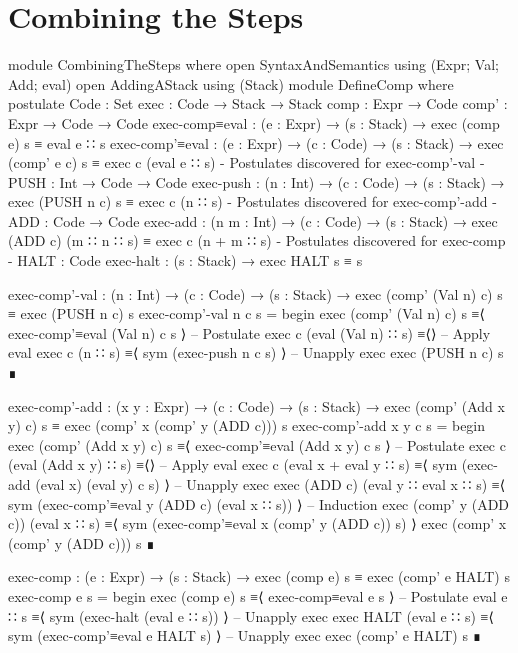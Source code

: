 \documentclass{article}
\begin{document}
\section{Combining the Steps}

\begin{code}
module CombiningTheSteps where
  open SyntaxAndSemantics using (Expr; Val; Add; eval)
  open AddingAStack using (Stack)
  module DefineComp where
    postulate
      Code : Set
      exec : Code → Stack → Stack
      comp : Expr → Code
      comp' : Expr → Code → Code
      exec-comp≡eval : (e : Expr) → (s : Stack)
        → exec (comp e) s ≡ eval e ∷ s
      exec-comp'≡eval : (e : Expr) → (c : Code) → (s : Stack)
        → exec (comp' e c) s ≡ exec c (eval e ∷ s)
      {- Postulates discovered for exec-comp'-val -}
      PUSH : Int → Code → Code
      exec-push : (n : Int) → (c : Code) → (s : Stack)
        → exec (PUSH n c) s ≡ exec c (n ∷ s)
      {- Postulates discovered for exec-comp'-add -}
      ADD : Code → Code
      exec-add : (n m : Int) → (c : Code) → (s : Stack)
        → exec (ADD c) (m ∷ n ∷ s) ≡ exec c (n + m ∷ s)
      {- Postulates discovered for exec-comp -}
      HALT : Code
      exec-halt : (s : Stack) → exec HALT s ≡ s
\end{code}
\begin{code}
    exec-comp'-val : (n : Int) → (c : Code) → (s : Stack)
      → exec (comp' (Val n) c) s ≡ exec (PUSH n c) s
    exec-comp'-val n c s =
      begin
        exec (comp' (Val n) c) s
      ≡⟨ exec-comp'≡eval (Val n) c s ⟩ -- Postulate
        exec c (eval (Val n) ∷ s)
      ≡⟨⟩ -- Apply eval
        exec c (n ∷ s)
      ≡⟨ sym (exec-push n c s) ⟩ -- Unapply exec
        exec (PUSH n c) s
      ∎
\end{code}
\begin{code}
    exec-comp'-add : (x y : Expr) → (c : Code) → (s : Stack)
      → exec (comp' (Add x y) c) s ≡ exec (comp' x (comp' y (ADD c))) s
    exec-comp'-add x y c s =
      begin
        exec (comp' (Add x y) c) s
      ≡⟨ exec-comp'≡eval (Add x y) c s ⟩ -- Postulate
        exec c (eval (Add x y) ∷ s)
      ≡⟨⟩ -- Apply eval
        exec c (eval x + eval y ∷ s)
      ≡⟨ sym (exec-add (eval x) (eval y) c s) ⟩ -- Unapply exec
        exec (ADD c) (eval y ∷ eval x ∷ s)
      ≡⟨ sym (exec-comp'≡eval y (ADD c) (eval x ∷ s)) ⟩ -- Induction
        exec (comp' y (ADD c)) (eval x ∷ s)
      ≡⟨ sym (exec-comp'≡eval x (comp' y (ADD c)) s) ⟩
        exec (comp' x (comp' y (ADD c))) s
      ∎
\end{code}
\begin{code}
    exec-comp : (e : Expr) → (s : Stack)
      → exec (comp e) s ≡ exec (comp' e HALT) s
    exec-comp e s =
      begin
        exec (comp e) s
      ≡⟨ exec-comp≡eval e s ⟩ -- Postulate
        eval e ∷ s
      ≡⟨ sym (exec-halt (eval e ∷ s)) ⟩ -- Unapply exec
        exec HALT (eval e ∷ s)
      ≡⟨ sym (exec-comp'≡eval e HALT s) ⟩ -- Unapply exec
        exec (comp' e HALT) s
      ∎
\end{code}
\end{document}
